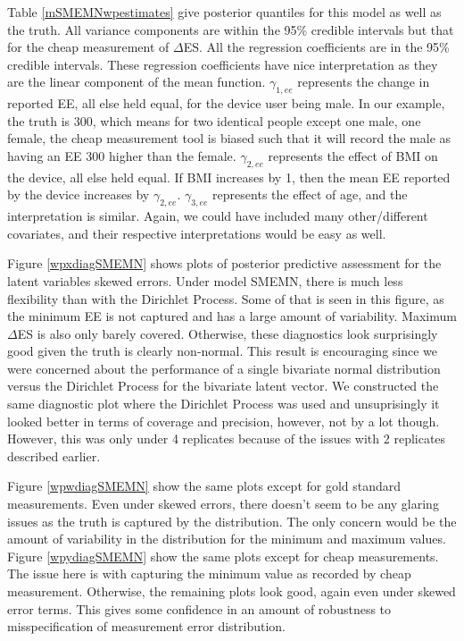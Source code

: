 \documentclass[11pt]{article}\usepackage[]{graphicx}\usepackage[]{color}
\begin{document}
Table  \ref{mSMEMNwpestimates} give posterior quantiles for this model as well as the truth.  All variance components are within the 95\% credible intervals but that for the cheap measurement of $\Delta$ES. All the regression coefficients are in the 95\% credible intervals. These regression coefficients have nice interpretation as they are the linear component of the mean function. $\gamma_{1,ee}$ represents the change in reported EE, all else held equal, for the device user being male. In our example, the truth is 300, which means for two identical people except one male, one female, the cheap measurement tool is biased such that it will record the male as having an EE 300 higher than the female. $\gamma_{2,ee}$ represents the effect of BMI on the device, all else held equal. If BMI increases by 1, then the mean EE reported by the device increases by $\gamma_{2,ee}$. $\gamma_{3,ee}$ represents the effect of age, and the interpretation is similar. Again, we could have included many other/different covariates, and their respective interpretations would be easy as well.

Figure  \ref{wpxdiagSMEMN} shows plots of posterior predictive assessment for the latent variables skewed errors. Under model SMEMN, there is much less flexibility than with the Dirichlet Process. Some of that is seen in this figure, as the minimum EE is not captured and has a large amount of variability. Maximum $\Delta$ES is also only barely covered. Otherwise, these diagnostics look surprisingly good given the truth is clearly non-normal. This result is encouraging since we were concerned about the performance of a single bivariate normal distribution versus the Dirichlet Process for the bivariate latent vector. We constructed the same diagnostic plot where the Dirichlet Process was used and unsuprisingly it looked better in terms of coverage and precision, however, not by a lot though. However, this was only under 4 replicates because of the issues with 2 replicates described earlier. 

Figure \ref{wpwdiagSMEMN} show the same plots except for gold standard measurements.  Even under skewed errors, there doesn't seem to be any glaring issues as the truth is captured by the distribution. The only concern would be the amount of variability in the distribution for the minimum and maximum values. Figure \ref{wpydiagSMEMN} show the same plots except for cheap measurements. The issue here is with capturing the minimum value as recorded by cheap measurement. Otherwise, the remaining plots look good, again even under skewed error terms. This gives some confidence in an amount of robustness to misspecification of measurement error distribution.
\end{document}
